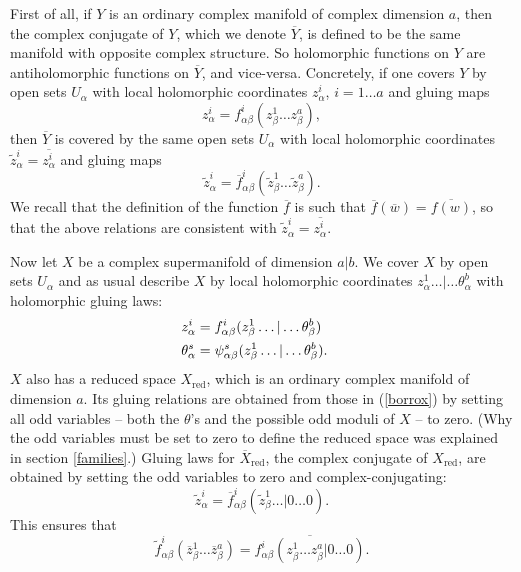\documentclass[11pt,a4paper]{article}
\def\t{{ \sf t}}
\def\tilde{\widetilde}
\def\red{{\mathrm{red}}}
\def\t{\tilde }
\def\tilde{\widetilde}
\def\bar{\overline}
\begin{document}
First of all, if $Y$ is an ordinary complex manifold of complex dimension $a$, then the complex conjugate of $Y$, which we denote $\bar Y$, is defined to be the same manifold with opposite
complex structure.  So holomorphic functions on $Y$ are antiholomorphic functions on $\bar Y$, and vice-versa.  Concretely, if one covers $Y$ by open
sets $U_\alpha$ with local holomorphic coordinates $z^i_\alpha$, $i=1\dots a$  and gluing maps
\begin{equation}\label{torkety} z^i_\alpha=f_{\alpha\beta}^i(z^1_\beta\dots z^a_\beta),\end{equation}
then $\bar Y$ is covered by the same open sets $U_\alpha$ with local holomorphic coordinates $\tilde z^i_\alpha=\bar{z^i_\alpha}$ and gluing maps
\begin{equation}\label{norkety} \t z^i_\alpha=\bar f^i_{\alpha\beta}(\t  z^1_\beta\dots\t z^a_\beta).\end{equation}
We recall that the definition of the function $\bar f$ is such that $\bar f(\bar w)=\bar{f(w)}$, so that the above relations are consistent with 
$\t z^i_\alpha=\bar{z^i_\alpha}$.

Now let $X$ be a complex supermanifold of dimension $a|b$.  We cover $X$ by open sets $U_\alpha$ and as usual describe $X$ by local
holomorphic coordinates $z^1_\alpha\dots|\dots\theta^b_\alpha$ 
with holomorphic gluing laws:
\begin{align}\label{borrox} z^i_\alpha & = f_{\alpha\beta}^i(z^1_\beta\dots|\dots \theta^b_\beta) \cr
                                                      \theta^s_\alpha& = \psi_{\alpha\beta}^s(z^1_\beta\dots|\dots\theta^b_\beta).\end{align}
$X$ also has a reduced space $X_\red$, which is an ordinary complex manifold of dimension $a$.  Its gluing relations are obtained
from those in (\ref{borrox}) by setting all odd variables -- both the $\theta$'s and the possible odd moduli of $X$ -- to zero.      (Why the
odd variables must be set to zero to define the reduced space was explained in section \ref{families}.)     
Gluing laws for $\bar X_\red$, the complex conjugate of $X_\red$, are obtained by setting the odd variables to zero and complex-conjugating:
 \begin{equation}\label{borroxx} \t z^i_\alpha  =\bar f_{\alpha\beta}^i(\t z^1_\beta\dots|0\dots 0).\end{equation}  
This ensures that 
\begin{equation}\label{onrel}\t f_{\alpha\beta}^i(\bar z^1_\beta\dots\bar z^a_\beta)=\bar{f_{\alpha\beta}^i(z^1_\beta\dots z^a_\beta|0\dots0)}.\end{equation} 
\end{document}
